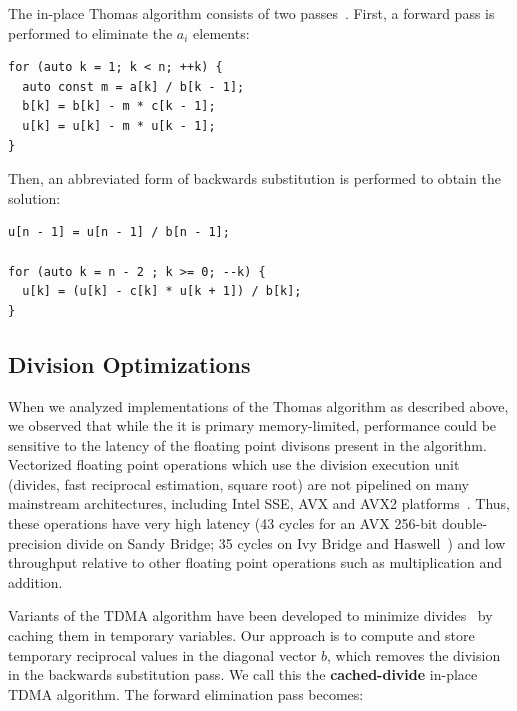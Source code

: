 \documentclass[conference]{IEEEtran}
\begin{document}
The in-place Thomas algorithm consists of two passes~\cite{QuarteroniEtAl2007}. 
First, a forward pass is performed to eliminate the $a_i$ elements:

\begin{lstlisting}
for (auto k = 1; k < n; ++k) {
  auto const m = a[k] / b[k - 1];
  b[k] = b[k] - m * c[k - 1];
  u[k] = u[k] - m * u[k - 1];
} 
\end{lstlisting}

Then, an abbreviated form of backwards substitution is performed to obtain the
solution:

\begin{lstlisting}
u[n - 1] = u[n - 1] / b[n - 1];

for (auto k = n - 2 ; k >= 0; --k) {
  u[k] = (u[k] - c[k] * u[k + 1]) / b[k];
} 
\end{lstlisting}


\subsection{Division Optimizations}

When we analyzed implementations of the Thomas algorithm as described above, we
observed that while the it is primary memory-limited, performance could be
sensitive to the latency of the floating point divisons present in the
algorithm. Vectorized floating point operations which use the division
execution unit (divides, fast reciprocal estimation, square root) are not
pipelined on many mainstream architectures, including Intel SSE, AVX and AVX2
platforms~\cite{}. Thus, these operations have very high latency (43 cycles for
an AVX 256-bit double-precision divide on Sandy Bridge; 35 cycles on Ivy Bridge
and Haswell~\cite{}) and low throughput relative to other floating point
operations such as multiplication and addition.

Variants of the TDMA algorithm have been developed to minimize 
  divides~\cite{QuarteroniEtAl2007} by caching them in temporary variables.
Our approach is to compute and store temporary reciprocal values in the
diagonal vector \(b\), which removes the division in the backwards 
substitution pass. We call this the
\textbf{cached-divide} in-place TDMA algorithm. The forward elimination pass
becomes:
\end{document}
